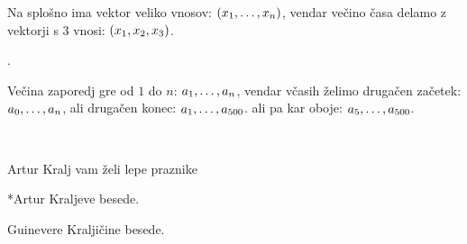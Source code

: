 \documentclass{article}
\begin{document}
\begin{minipage}{0.4\textwidth}
Na splošno ima vektor 
veliko vnosov: 
$\vektor[n]{x}$,
vendar večino časa delamo z 
vektorji s 3 vnosi:
  $\vektor{x}$.
\end{minipage}

\vspace{2cm}

\begin{minipage}{0.4\textwidth}
  \ukaz 
  .
\end{minipage}

\vspace{2cm}

\begin{minipage}{0.4\textwidth}
  Večina zaporedj gre od $1$ do $n$:
  $\zapLim{a}$,
  vendar včasih želimo drugačen začetek:
  $\zapLim<0>{a}$,
  ali drugačen konec:
  $\zapLim[500]{a}$.
  ali pa kar oboje:
  $\zapLim<5>[500]{a}$.
\end{minipage}

\vspace{2cm}

\begin{minipage}
{0.4\textwidth}
  \\
\end{minipage}


\vspace{2cm}
\begin{kraljIme}{Artur}
  Kralj vam želi lepe praznike
\end{kraljIme}


\vspace{2cm}

\begin{kralji}*{Artur}
  Kraljeve besede.
\end{kralji}

\begin{kralji}{Guinevere}
  Kraljičine besede.
\end{kralji}
\end{document}
